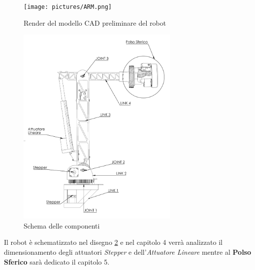 \documentclass[%
corpo=11pt,
twoside,
 stile=classica,
oldstyle,
greek,%
]{toptesi}
\begin{document}
	\begin{figure}
	\centering
	\texttt{[image: pictures/ARM.png]}
	\caption{Render del modello CAD preliminare del robot}
	\label{fig:render}
\end{figure}
	\begin{figure}
	\centering
	\includegraphics[width=0.7\textwidth]{Screen/ARMBollato.png}
	\caption{Schema delle componenti}
	\label{fig:bollatura}
\end{figure}
Il robot è schematizzato nel disegno \ref{fig:bollatura} e nel capitolo 4 verrà analizzato il dimensionamento degli attuatori \textit{Stepper} e dell'\textit{Attuatore Lineare} mentre al \textbf{Polso Sferico} sarà dedicato il capitolo 5. 

	
\end{document}
